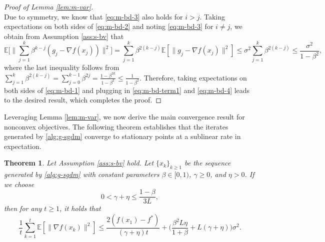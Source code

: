\documentclass[10pt]{article}
\numberwithin{equation}{section}
\newtheorem{theorem}{Theorem}
\theoremstyle{definition}
\newcommand{\ebb}{\mathbb{E}}  %
\begin{document}
\begin{proof}[Proof of Lemma \ref{lem:m-var}]
\begin{equation}
    \end{equation}
    Due to symmetry, we know that \eqref{eq:m-bd-3} also holds for $i>j$. Taking expectations on both sides of \eqref{eq:m-bd-2} and noting \eqref{eq:m-bd-3} for $i\neq j$, we obtain from Assumption \ref{ass:s-bv} that
    \begin{equation}\label{eq:m-bd-4}
        \ebb\Big[\Big\|\sum_{j=1}^k \beta^{k-j}(g_j-\nabla f(x_j))\Big\|^2\Big] = \sum_{j=1}^k\beta^{2(k-j)}\ebb[\|g_j-\nabla f(x_j)\|^2]\leq \sigma^2\sum_{j=1}^k\beta^{2(k-j)}\leq\frac{\sigma^2}{1-\beta^2},
    \end{equation}
    where the last inequality follows from $\sum_{j=1}^k\beta^{2(k-j)}=\sum_{j=0}^{k-1}\beta^{2j}=\frac{1-\beta^{2k}}{1-\beta^2}\leq\frac{1}{1-\beta^2}$. Therefore, taking expectations on both sides of \eqref{eq:m-bd-1} and plugging in \eqref{eq:m-bd-term1} and \eqref{eq:m-bd-4} leads to the desired result, which completes the proof.
\end{proof}

Leveraging Lemma \ref{lem:m-var}, we now derive the main convergence result for nonconvex objectives. The following theorem establishes that the iterates generated by \eqref{alg:g-sgdm} converge to stationary points at a sublinear rate in expectation.
\begin{theorem}\label{thm:nc}
    Let Assumption \ref{ass:s-bv} hold. Let $\{x_k\}_{k\ge 1}$ be the sequence generated by \eqref{alg:g-sgdm} with constant parameters $\beta\in [0,1)$, $\gamma\ge 0$, and $\eta>0$. If we choose
\[
0<\gamma+\eta \leq \frac{1-\beta}{3 L},
\]
then for any $t\ge 1$, it holds that
\[
    \frac{1}{t}\sum_{k=1}^t \ebb[\|\nabla f(x_k)\|^2]\leq \frac{2(f(x_1)-f^*)}{(\gamma+\eta)t}+\Big(\frac{\beta^2 L \eta}{1+\beta}+L(\gamma+\eta)\Big)\sigma^2.
\]
\end{theorem}
\end{document}
